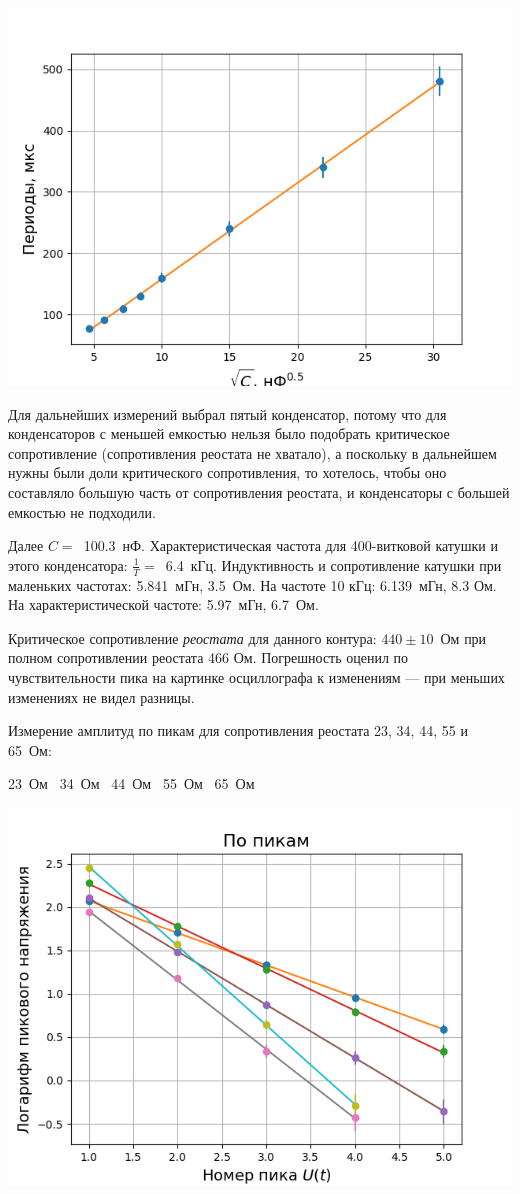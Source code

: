 \documentclass[a4paper, 12pt]{article}
\begin{document}
\begin{center}
\includegraphics[width=0.5\linewidth]{check_periods.png}
\end{center}

Для дальнейших измерений выбрал пятый конденсатор, потому что для конденсаторов с меньшей емкостью нельзя было подобрать критическое сопротивление (сопротивления реостата не хватало), а поскольку в дальнейшем нужны были доли критического сопротивления, то хотелось, чтобы оно составляло большую часть от сопротивления реостата, и конденсаторы с большей емкостью не подходили.

Далее $C =$~100.3~нФ.
Характеристическая частота для 400-витковой катушки и этого конденсатора: $\frac{1}{T} =$~6.4~кГц.
Индуктивность и сопротивление катушки при маленьких частотах: 5.841~мГн, 3.5~Ом.
На частоте 10 кГц: 6.139~мГн, 8.3 Ом.
На характеристической частоте: 5.97~мГн, 6.7~Ом.

Критическое сопротивление \emph{реостата} для данного контура: $440 \pm 10$~Ом при полном сопротивлении реостата 466 Ом.
Погрешность оценил по чувствительности пика на картинке осциллографа к изменениям --- при меньших изменениях не видел разницы.

Измерение амплитуд по пикам для сопротивления реостата 23, 34, 44, 55 и 65~Ом:
\begin{table}[h]
23~Ом~
34~Ом~
44~Ом~
55~Ом~
65~Ом~
\end{table}
\begin{center}
\includegraphics[width=0.7\linewidth]{qfactor_peaks.png}
\end{center}
\end{document}
